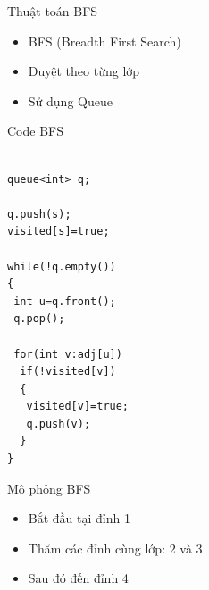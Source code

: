 \documentclass[aspectratio=169]{beamer}
\begin{document}
\begin{frame}{Thuật toán BFS}

\begin{itemize}

\item BFS (Breadth First Search)

\item Duyệt theo từng lớp

\item Sử dụng Queue

\end{itemize}

\end{frame}

\begin{frame}[fragile]{Code BFS}

\begin{verbatim}

queue<int> q;

q.push(s);
visited[s]=true;

while(!q.empty())
{
 int u=q.front();
 q.pop();

 for(int v:adj[u])
  if(!visited[v])
  {
   visited[v]=true;
   q.push(v);
  }
}

\end{verbatim}

\end{frame}

\begin{frame}{Mô phỏng BFS}

\begin{center}


\end{center}

\begin{itemize}

\item<1-> Bắt đầu tại đỉnh 1
\item<2-> Thăm các đỉnh cùng lớp: 2 và 3
\item<3-> Sau đó đến đỉnh 4

\end{itemize}

\end{frame}
\end{document}
